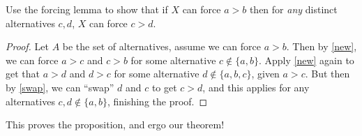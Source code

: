 \begin{prob}
    Use the forcing lemma to show that if $X$ can force $a>b$ then for \emph{any} distinct alternatives $c,d$, $X$ can force $c>d$.
\end{prob}
\begin{proof}
    Let $A$ be the set of alternatives, assume we can force $a>b$. Then by \cref{new}, we can force $a>c$ and $c>b$ for some alternative $c\notin \{a,b\} $. Apply \cref{new} again to get that $a>d$ and $d>c$ for some alternative $d\notin \{a,b,c\} $, given $a>c$. But then by \cref{swap}, we can ``swap'' $d$ and $c$ to get $c>d$, and this applies for any alternatives $c,d\notin \{a,b\}$, finishing the proof.
\end{proof}
This proves the proposition, and ergo our theorem!
